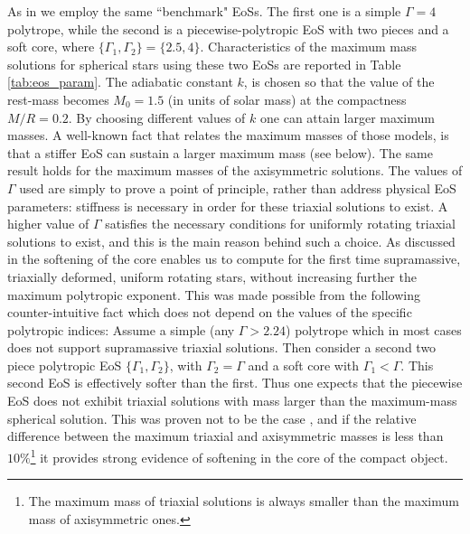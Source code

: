 \documentclass[twocolumn,superscriptaddress,showpacs,prd,aps,amsmath,amssymb,nofootinbib]{revtex4-1}
\begin{document}
As in \cite{UTea2016} we employ the same ``benchmark" EoSs. The first
one is a simple $\Gamma=4$ polytrope, while the second is a
piecewise-polytropic EoS with two pieces and a soft core, where
$\{\Gamma_1,\Gamma_2\}=\{2.5,4\}$.  Characteristics of the maximum
mass solutions for spherical stars using these two EoSs are reported
in Table \ref{tab:eos_param}. The adiabatic constant $k$, is chosen so
that the value of the rest-mass becomes $M_0 = 1.5$ (in units of solar
mass) at the compactness $M/R = 0.2$. By choosing different values of
$k$ one can attain larger maximum masses.  A well-known fact that
relates the maximum masses of those models, is that a stiffer EoS can
sustain a larger maximum mass (see below). The same result holds for
the maximum masses of the axisymmetric solutions.  The values of
$\Gamma$ used are simply to prove a point of principle, rather than
address physical EoS parameters: stiffness is necessary in order for
these triaxial solutions to exist. A higher value of $\Gamma$
satisfies the necessary conditions for uniformly rotating triaxial
solutions to exist, and this is the main reason behind such a choice.
As discussed in \cite{UTea2016} the softening of the core enables us
to compute for the first time supramassive, triaxially deformed,
uniform rotating stars, without increasing further the maximum
polytropic exponent. This was made possible from the following
counter-intuitive fact which does not depend on the values of the
specific polytropic indices: Assume a simple (any $\Gamma>2.24$)
polytrope which in most cases does not support supramassive triaxial
solutions. Then consider a second two piece polytropic EoS
$\{\Gamma_1,\Gamma_2\}$, with $\Gamma_2=\Gamma$ and a soft core with
$\Gamma_1<\Gamma$. This second EoS is effectively softer than the
first. Thus one expects that the piecewise EoS does not exhibit 
triaxial solutions with mass larger than the maximum-mass spherical 
solution. This was proven not to be the case \cite{UTea2016}, and if the
relative difference between the maximum triaxial and axisymmetric masses 
is less than $10\%$\footnote{The maximum mass of triaxial solutions is 
always smaller than the maximum mass of axisymmetric ones.} 
it provides strong evidence of softening in the core of the compact object. 
\end{document}

